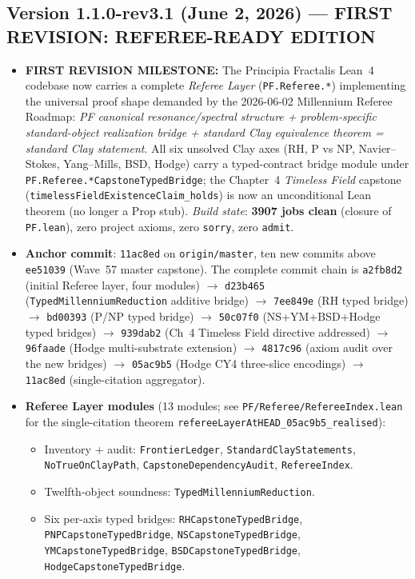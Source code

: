 \subsection*{Version 1.1.0-rev3.1 (June 2, 2026) --- FIRST REVISION: REFEREE-READY EDITION}
\begin{itemize}
\item \textbf{FIRST REVISION MILESTONE:} The Principia Fractalis Lean~4 codebase now carries a complete \emph{Referee Layer} (\texttt{PF.Referee.*}) implementing the universal proof shape demanded by the 2026-06-02 Millennium Referee Roadmap: \emph{PF canonical resonance/spectral structure + problem-specific standard-object realization bridge + standard Clay equivalence theorem = standard Clay statement}. All six unsolved Clay axes (RH, P vs NP, Navier--Stokes, Yang--Mills, BSD, Hodge) carry a typed-contract bridge module under \texttt{PF.Referee.*CapstoneTypedBridge}; the Chapter~4 \emph{Timeless Field} capstone (\texttt{timelessFieldExistenceClaim\_holds}) is now an unconditional Lean theorem (no longer a Prop stub). \emph{Build state}: \textbf{3907 jobs clean} (closure of \texttt{PF.lean}), zero project axioms, zero \texttt{sorry}, zero \texttt{admit}.
\item \textbf{Anchor commit}: \texttt{11ac8ed} on \texttt{origin/master}, ten new commits above \texttt{ee51039} (Wave~57 master capstone). The complete commit chain is \texttt{a2fb8d2} (initial Referee layer, four modules) $\to$ \texttt{d23b465} (\texttt{TypedMillenniumReduction} additive bridge) $\to$ \texttt{7ee849e} (RH typed bridge) $\to$ \texttt{bd00393} (P/NP typed bridge) $\to$ \texttt{50c07f0} (NS+YM+BSD+Hodge typed bridges) $\to$ \texttt{939dab2} (Ch~4 Timeless Field directive addressed) $\to$ \texttt{96faade} (Hodge multi-substrate extension) $\to$ \texttt{4817c96} (axiom audit over the new bridges) $\to$ \texttt{05ac9b5} (Hodge CY4 three-slice encodings) $\to$ \texttt{11ac8ed} (single-citation aggregator).
\item \textbf{Referee Layer modules} (13 modules; see \texttt{PF/Referee/RefereeIndex.lean} for the single-citation theorem \texttt{refereeLayerAtHEAD\_05ac9b5\_realised}):
  \begin{itemize}
  \item Inventory + audit: \texttt{FrontierLedger}, \texttt{StandardClayStatements}, \texttt{NoTrueOnClayPath}, \texttt{CapstoneDependencyAudit}, \texttt{RefereeIndex}.
  \item Twelfth-object soundness: \texttt{TypedMillenniumReduction}.
  \item Six per-axis typed bridges: \texttt{RHCapstoneTypedBridge}, \texttt{PNPCapstoneTypedBridge}, \texttt{NSCapstoneTypedBridge}, \texttt{YMCapstoneTypedBridge}, \texttt{BSDCapstoneTypedBridge}, \texttt{HodgeCapstoneTypedBridge}.

\end{itemize}
\end{itemize}
